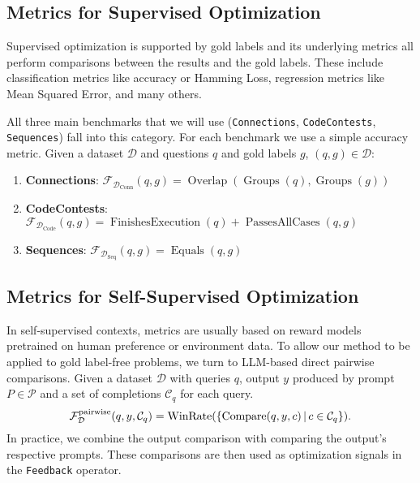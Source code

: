 \subsection{Metrics for Supervised Optimization}
Supervised optimization is supported by gold labels and its underlying metrics all perform comparisons between the results and the gold labels.
These include classification metrics like accuracy or Hamming Loss, regression metrics like Mean Squared Error, and many others.

All three main benchmarks that we will use (\texttt{Connections}, \texttt{CodeContests}, \texttt{Sequences}) 
fall into this category. For each benchmark we use a simple accuracy metric. Given a dataset $\mathcal{D}$ and questions $q$ and gold labels $g$, $(q,g) \in \mathcal{D}$:
\begin{enumerate}
    \item \textbf{Connections}:  $\mathcal{F}_{\mathcal{D}_{\text{Conn}}}(q, g) = \operatorname{Overlap}(\operatorname{Groups}(q), \operatorname{Groups}(g))$
    \item \textbf{CodeContests}: $\mathcal{F}_{\mathcal{D}_{\text{Code}}}(q, g) = \operatorname{FinishesExecution}(q) + \operatorname{PassesAllCases}(q, g)$
    \item \textbf{Sequences}: $\mathcal{F}_{\mathcal{D}_{\text{Seq}}}(q, g) = \operatorname{Equals}(q, g)$
\end{enumerate} 

\subsection{Metrics for Self-Supervised Optimization}\label{sec:ssometrics}
In self-supervised contexts, metrics are usually based on reward models pretrained on human preference or environment data.
To allow our method to be applied to gold label-free problems, we turn to LLM-based direct pairwise comparisons.
Given a dataset $\mathcal{D}$ with queries $q$, output $y$ produced by prompt $P \in \mathcal{P}$ and a set of completions $\mathcal{C}_{q}$ for each query.
\begin{equation}
    \mathcal{F}_{\mathcal{D}}^{\text{pairwise}}(q, y, \mathcal{C}_{q}) = \operatorname{WinRate}(\{\operatorname{Compare}(q,y,c)\, \vert \, c\in \mathcal{C}_{q}\}).
\end{equation}
In practice, we combine the output comparison with comparing the output's respective prompts.
These comparisons are then used as optimization signals in the \texttt{Feedback} operator.

